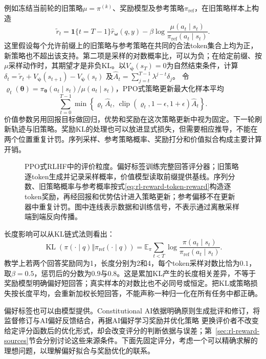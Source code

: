 例如冻结当前轮的旧策略$\mu=\pi^{(k)}$、奖励模型及参考策略$\pi_{\mathrm{ref}}$，在旧策略样本上构造
\begin{equation}
  \widetilde r_t
  =\mathbf1\{t=T-1\}\widehat r_{\bm{\omega}}(q,y)
  -\beta\log\frac{\mu(a_t\mid s_t)}
                      {\pi_{\mathrm{ref}}(a_t\mid s_t)}.
  \label{eq:rl-reward-token-reward}
\end{equation}
这里假设每个允许前缀上的旧策略与参考策略在共同的合法token集合上均为正，新策略也不超出该支持。第二项是采样的对数概率比，可以为负；在给定前缀、按$\mu$采样动作时，其期望才是非负KL。以$V_{\bm{\psi}}(s_T)=0$为自然结束条件，计算
$\delta_t=\widetilde r_t+V_{\bm{\psi}}(s_{t+1})-V_{\bm{\psi}}(s_t)$
及$\widehat A_t=\sum_{j=t}^{T-1}\lambda^{j-t}\delta_j$。
令$\varrho_t(\bm{\theta})=\pi_{\bm{\theta}}(a_t\mid s_t)/\mu(a_t\mid s_t)$，PPO式策略更新最大化样本平均
\begin{equation}
  \sum_{t=0}^{T-1}
  \min\!\left\{\varrho_t\widehat A_t,\,
  \operatorname{clip}(\varrho_t,1-\epsilon,1+\epsilon)\widehat A_t\right\}.
  \label{eq:rl-reward-ppo}
\end{equation}
价值参数另用回报目标做回归，优势和奖励在这次策略更新中视为固定。下一轮刷新轨迹与旧策略。奖励KL的处理也可以放进显式损失，但需要相应推导，不能在两个位置重复计罚。序列采样、参考策略概率、奖励打分和价值拟合构成主要计算开销。

\begin{figure}[htbp]
  \centering
  
  \caption{PPO式RLHF中的评价粒度。偏好标签训练完整回答评分器；旧策略逐token生成并记录采样概率，价值模型读取前缀提供基线。序列分数、旧策略概率与参考概率按式\eqref{eq:rl-reward-token-reward}构造逐token奖励，再经回报和优势估计进入策略更新；参考偏移不在更新器中重复计罚。图中连线表示数据和训练信号，不表示通过离散采样端到端反向传播。}
  \label{fig:rl-reward-rlhf}
\end{figure}

长度影响可以从KL链式法则看出：
\[
  \operatorname{KL}(\pi(\cdot\mid q)\Vert\pi_{\mathrm{ref}}(\cdot\mid q))
  =\mathbb E_\pi\sum_{t<T}
    \log\frac{\pi(a_t\mid s_t)}{\pi_{\mathrm{ref}}(a_t\mid s_t)}.
\]
教学上若两个回答奖励同为1，长度分别为2和4，每个token采样对数比恰为$0.1$，取$\beta=0.5$，惩罚后的分数为$0.9$与$0.8$。这是累加KL产生的长度相关差异，不等于奖励模型明确偏好短回答；真实样本的对数比也不必同号或恒定。把KL或策略损失按长度平均，会重新加权长短回答，不能声称一种归一化在所有任务中都正确。

偏好标签也可以由模型提供。Constitutional AI依据明确原则生成批评和修订，将监督修订与AI偏好反馈结合，再据AI偏好学习奖励并优化策略
更换评价者不改变给定评分函数后的优化形式，却会改变评分的判断依据与误差；第~\ref{sec:rl-reward-sources}节会分别讨论这些来源条件。下面先固定评分，考虑一个可以精确求解的理想问题，以理解偏好拟合与奖励优化的联系。

